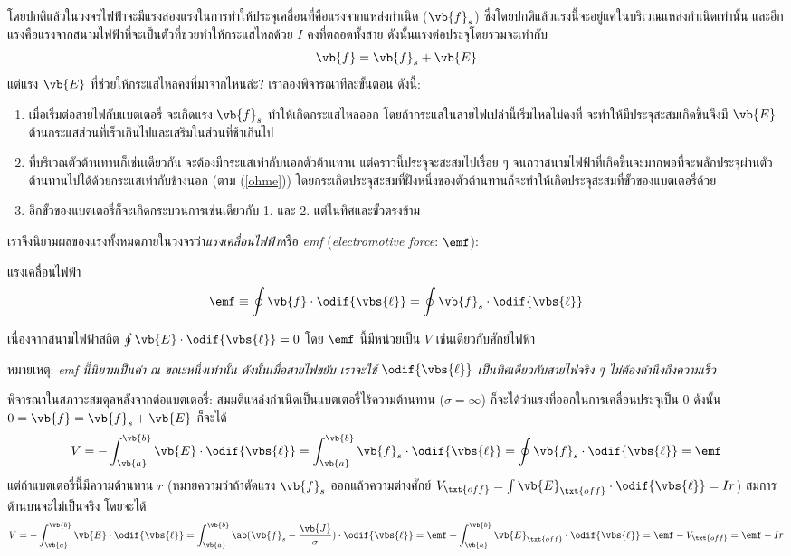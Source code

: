 โดยปกติแล้วในวงจรไฟฟ้าจะมีแรงสองแรงในการทำให้ประจุเคลื่อนที่คือแรงจากแหล่งกำเนิด ($\vb{f}_s$) ซึ่งโดยปกติแล้วแรงนี้จะอยู่แค่ในบริเวณแหล่งกำเนิดเท่านั้น และอีกแรงคือแรงจากสนามไฟฟ้าที่จะเป็นตัวที่ช่วยทำให้กระแสไหลด้วย $I$ คงที่ตลอดทั้งสาย ดังนั้นแรงต่อประจุโดยรวมจะเท่ากับ
\[ 
\vb{f} = \vb{f}_s + \vb{E} 
\]
แต่แรง $\vb{E}$ ที่ช่วยให้กระแสไหลคงที่มาจากไหนล่ะ? เราลองพิจารณาทีละขั้นตอน ดังนี้:
\begin{enumerate} 
    \item เมื่อเริ่มต่อสายไฟกับแบตเตอรี่ จะเกิดแรง $\vb{f}_s$ ทำให้เกิดกระแสไหลออก โดยถ้ากระแสในสายไฟเปล่านี้เริ่มไหลไม่คงที่ จะทำให้มีประจุสะสมเกิดขึ้นจึงมี $\vb{E}$ ต้านกระแสส่วนที่เร็วเกินไปและเสริมในส่วนที่ช้าเกินไป
    \item ที่บริเวณตัวต้านทานก็เช่นเดียวกัน จะต้องมีกระแสเท่ากับนอกตัวต้านทาน แต่คราวนี้ประจุจะสะสมไปเรื่อย ๆ จนกว่าสนามไฟฟ้าที่เกิดขึ้นจะมากพอที่จะพลักประจุผ่านตัวต้านทานไปได้ด้วยกระแสเท่ากับข้างนอก (ตาม (\ref{ohme})) โดยกระเกิดประจุสะสมที่ฝั่งหนึ่งของตัวต้านทานก็จะทำให้เกิดประจุสะสมที่ขั้วของแบตเตอรี่ด้วย
    \item อีกขั้วของแบตเตอรี่ก็จะเกิดกระบวนการเช่นเดียวกับ 1. และ 2. แต่ในทิศและขั้วตรงข้าม
\end{enumerate}
เราจึงนิยามผลของแรงทั้งหมดภายในวงจรว่า\emph{แรงเคลื่อนไฟฟ้า}หรือ \emph{emf} (\emph{electromotive force}: $\emf$):
\begin{defbox}{แรงเคลื่อนไฟฟ้า} 
    \begin{equation} 
        \emf \equiv \oint \vb{f}\cdot\odif{\vbs{\ell}} = \oint \vb{f}_s\cdot\odif{\vbs{\ell}} 
    \end{equation} 
\end{defbox}
เนื่องจากสนามไฟฟ้าสถิต $\oint \vb{E}\cdot\odif{\vbs{\ell}} = 0$ โดย $\emf$ นี้มีหน่วยเป็น $\unit{V}$ เช่นเดียวกับศักย์ไฟฟ้า

หมายเหตุ: \emph{emf นี้นิยามเป็นค่า ณ ขณะหนึ่งเท่านั้น ดังนั้นเมื่อสายไฟขยับ เราจะใช้ $\odif{\vbs{\ell}}$ เป็นทิศเดียวกับสายไฟจริง ๆ ไม่ต้องคำนึงถึงความเร็ว}

พิจารณาในสภาวะสมดุลหลังจากต่อแบตเตอรี่: สมมติแหล่งกำเนิดเป็นแบตเตอรี่ไร้ความต้านทาน ($\sigma = \infty$) ก็จะได้ว่าแรงที่ออกในการเคลื่อนประจุเป็น $0$ ดังนั้น $0 = \vb{f} = \vb{f}_s + \vb{E}$ ก็จะได้
\begin{equation} 
    V = -\int_{\vb{a}}^{\vb{b}} \vb{E}\cdot\odif{\vbs{\ell}} = \int_{\vb{a}}^{\vb{b}} \vb{f}_s\cdot\odif{\vbs{\ell}} = \oint \vb{f}_s\cdot\odif{\vbs{\ell}} = \emf 
\end{equation}
แต่ถ้าแบตเตอรี่นี้มีความต้านทาน $r$ (หมายความว่าถ้าตัดแรง $\vb{f}_s$ ออกแล้วความต่างศักย์ $V_\txt{off} = \int\vb{E}_\txt{off}\cdot\odif{\vbs{\ell}} = Ir$) สมการด้านบนจะไม่เป็นจริง โดยจะได้
\begin{equation} 
    V = -\int_{\vb{a}}^{\vb{b}} \vb{E}\cdot\odif{\vbs{\ell}} = \int_{\vb{a}}^{\vb{b}} \ab(\vb{f}_s - \frac{\vb{J}}{\sigma})\cdot\odif{\vbs{\ell}} = \emf + \int_{\vb{a}}^{\vb{b}} \vb{E}_\txt{off}\cdot\odif{\vbs{\ell}} = \emf - V_\txt{off} = \emf - Ir 
\end{equation}


